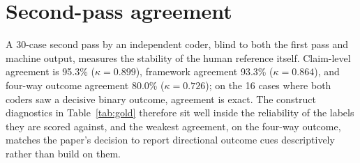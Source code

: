 \documentclass[11pt]{article}
\begin{document}
\section{Second-pass agreement}\label{app:secondpass}

A 30-case second pass by an independent coder, blind to both the first pass and machine output, measures the stability of the human reference itself. Claim-level agreement is 95.3\% ($\kappa=0.899$), framework agreement 93.3\% ($\kappa=0.864$), and four-way outcome agreement 80.0\% ($\kappa=0.726$); on the 16 cases where both coders saw a decisive binary outcome, agreement is exact. The construct diagnostics in Table~\ref{tab:gold} therefore sit well inside the reliability of the labels they are scored against, and the weakest agreement, on the four-way outcome, matches the paper's decision to report directional outcome cues descriptively rather than build on them.
\end{document}
